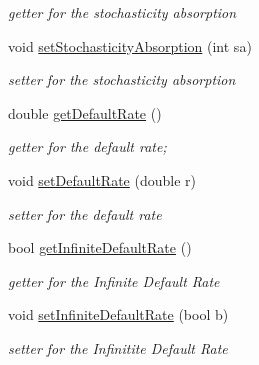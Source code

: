 \begin{DoxyCompactItemize}
\begin{DoxyCompactList}\small\item\em getter for the stochasticity absorption \end{DoxyCompactList}\item 
\hypertarget{classPH_a78fb558177760ed0e640d8a0aaf8b06a}{void \hyperlink{classPH_a78fb558177760ed0e640d8a0aaf8b06a}{set\+Stochasticity\+Absorption} (int sa)}\label{classPH_a78fb558177760ed0e640d8a0aaf8b06a}

\begin{DoxyCompactList}\small\item\em setter for the stochasticity absorption \end{DoxyCompactList}\item 
\hypertarget{classPH_aa64e3d43f773122df2329491f6abdf6c}{double \hyperlink{classPH_aa64e3d43f773122df2329491f6abdf6c}{get\+Default\+Rate} ()}\label{classPH_aa64e3d43f773122df2329491f6abdf6c}

\begin{DoxyCompactList}\small\item\em getter for the default rate; \end{DoxyCompactList}\item 
\hypertarget{classPH_ae49be2823d5a2a7c6517b6783cf9fdfa}{void \hyperlink{classPH_ae49be2823d5a2a7c6517b6783cf9fdfa}{set\+Default\+Rate} (double r)}\label{classPH_ae49be2823d5a2a7c6517b6783cf9fdfa}

\begin{DoxyCompactList}\small\item\em setter for the default rate \end{DoxyCompactList}\item 
\hypertarget{classPH_a7ede855d04ee8e3a20beb159c5520003}{bool \hyperlink{classPH_a7ede855d04ee8e3a20beb159c5520003}{get\+Infinite\+Default\+Rate} ()}\label{classPH_a7ede855d04ee8e3a20beb159c5520003}

\begin{DoxyCompactList}\small\item\em getter for the Infinite Default Rate \end{DoxyCompactList}\item 
\hypertarget{classPH_acc38a15dc0e29ddfd2c8ae7d3371f7ab}{void \hyperlink{classPH_acc38a15dc0e29ddfd2c8ae7d3371f7ab}{set\+Infinite\+Default\+Rate} (bool b)}\label{classPH_acc38a15dc0e29ddfd2c8ae7d3371f7ab}

\begin{DoxyCompactList}\small\item\em setter for the Infinitite Default Rate \end{DoxyCompactList}\end{DoxyCompactItemize}
